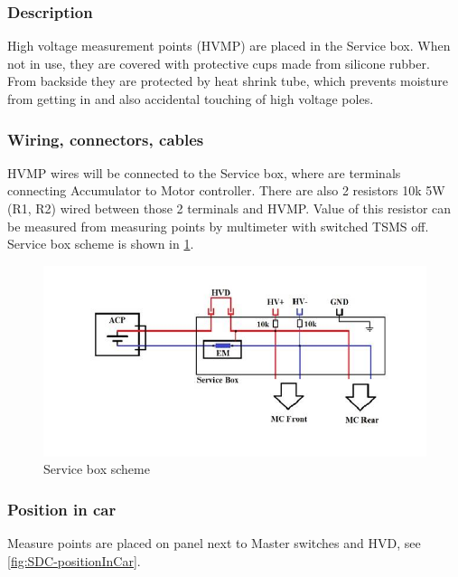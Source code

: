 \subsubsection{Description}

High voltage measurement points (HVMP) are placed in the Service box. When not in use, they are covered with protective cups made from silicone rubber. From backside they are protected by heat shrink tube, which prevents moisture from getting in and also accidental touching of high voltage poles.

\subsubsection{Wiring, connectors, cables}

HVMP wires will be connected to the Service box, where are terminals connecting Accumulator to Motor controller. There are also 2 resistors 10k 5W (R1, R2) wired between those 2 terminals and HVMP. Value of this resistor can be measured from measuring points by multimeter with switched TSMS off. Service box scheme is shown in \ref{fig:ServiceBox/scheme}.

\begin{figure}[H]
	\includegraphics[width=\textwidth]{./img/ServiceBox-scheme.jpg}
	\caption{Service box scheme}
	\label{fig:ServiceBox/scheme}
\end{figure}

\subsubsection{Position in car}

Measure points are placed on panel next to Master switches and HVD, see \ref{fig:SDC-positionInCar}.